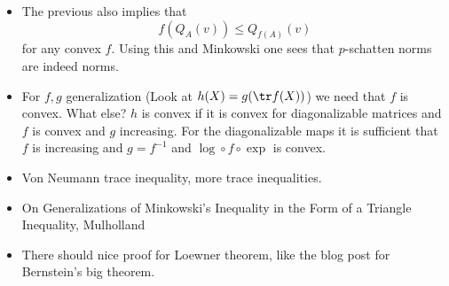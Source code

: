 \begin{itemize}
	\item The previous also implies that
	\[
		f(Q_{A}(v)) \leq Q_{f(A)}(v)
	\]
	for any convex $f$. Using this and Minkowski one sees that $p$-schatten norms are indeed norms.
	\item For $f, g$ generalization (Look at $h(X) = g (\tr f(X))$) we need that $f$ is convex. What else? $h$ is convex if it is convex for diagonalizable matrices and $f$ is convex and $g$ increasing. For the diagonalizable maps it is sufficient that $f$ is increasing and $g = f^{-1}$ and $\log \circ f \circ \exp$ is convex.
	\item Von Neumann trace inequality, more trace inequalities.
	\item On Generalizations of Minkowski's Inequality in the Form of a Triangle Inequality, Mulholland
	\item There should nice proof for Loewner theorem, like the blog post for Bernstein's big theorem.
\end{itemize}
